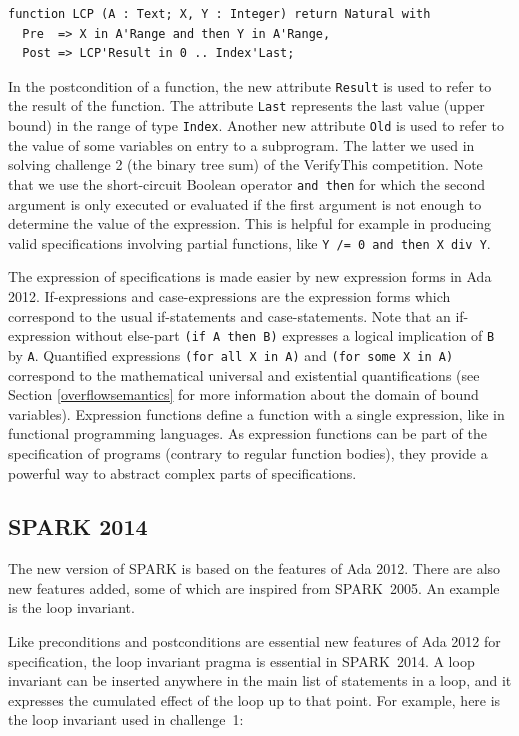 \documentclass[sttt,final]{svjour}
\newcommand{\oldspark}{SPARK~2005\xspace}
\newcommand{\newspark}{SPARK~2014\xspace}
\begin{document}
\begin{lstlisting}
function LCP (A : Text; X, Y : Integer) return Natural with
  Pre  => X in A'Range and then Y in A'Range,
  Post => LCP'Result in 0 .. Index'Last;
\end{lstlisting}

In the postcondition of a function, the new attribute \verb|Result| is
used to refer to the result of the function. The attribute \verb|Last|
represents the last value (upper bound) in the range of type
\verb|Index|. Another new attribute \verb|Old| is used to refer to the
value of some variables on entry to a subprogram. The latter we used
in solving challenge 2 (the binary tree sum) of the VerifyThis
competition. Note that we use the short-circuit Boolean operator
\verb|and then| for which the second argument is only executed or
evaluated if the first argument is not enough to determine the value
of the expression. This is helpful for example in producing valid
specifications involving partial functions, like
\verb|Y /= 0 and then X div Y|.

The expression of specifications is made easier by new expression
forms in Ada 2012. If-expressions and case-expressions are the
expression forms which correspond to the usual if-statements and
case-statements. Note that an if-expression without else-part
\verb|(if A then B)| expresses a logical implication of \verb|B| by
\verb|A|. Quantified expressions \verb|(for all X in A)| and
\verb|(for some X in A)| correspond to the mathematical universal and
existential quantifications (see Section \ref{overflowsemantics} for
more information about the domain of bound variables). Expression
functions define a function with a single expression, like in
functional programming languages. As expression functions can be part
of the specification of programs (contrary to regular function
bodies), they provide a powerful way to abstract complex parts of
specifications.

\subsection{SPARK 2014}

The new version of SPARK is based on the features of Ada 2012. There
are also new features added, some of which are inspired from
\oldspark. An example is the loop invariant.

Like preconditions and postconditions are essential new features of
Ada 2012 for specification, the loop invariant pragma is essential in
\newspark. A loop invariant can be inserted anywhere in the main list
of statements in a loop, and it expresses the cumulated effect of the
loop up to that point. For example, here is the loop invariant used in
challenge~1:
\end{document}
